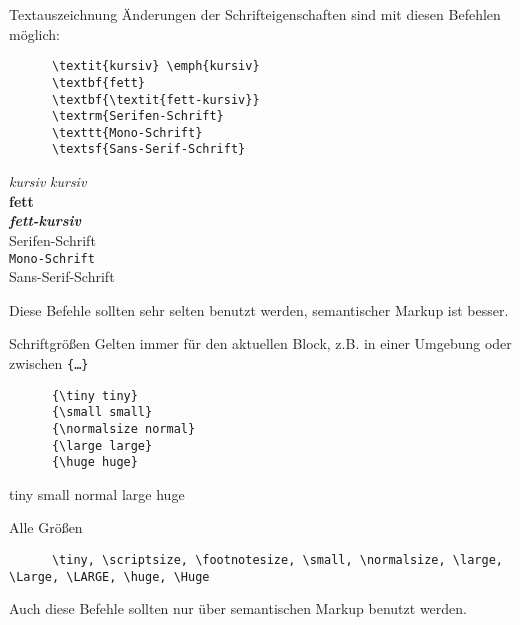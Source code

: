 \begin{frame}[fragile]{Textauszeichnung}
  Änderungen der Schrifteigenschaften sind mit diesen Befehlen möglich:
  \begin{CodeExample}{0.60}
    \begin{lstlisting}
      \textit{kursiv} \emph{kursiv}
      \textbf{fett}
      \textbf{\textit{fett-kursiv}}
      \textrm{Serifen-Schrift}
      \texttt{Mono-Schrift}
      \textsf{Sans-Serif-Schrift}
    \end{lstlisting}
  \CodeResult
    \textit{kursiv} \emph{kursiv} \\
    \textbf{fett} \\
    \textbf{\textit{fett-kursiv}} \\
    \textrm{Serifen-Schrift} \\
    \texttt{Mono-Schrift} \\
    \textsf{Sans-Serif-Schrift}
  \end{CodeExample}

  \vspace{1em}
  Diese Befehle sollten sehr selten benutzt werden, semantischer Markup ist besser.
\end{frame}

\begin{frame}[fragile]{Schriftgrößen}
  Gelten immer für den aktuellen Block, z.B. in einer Umgebung oder zwischen \texttt{\{…\}}
  \begin{CodeExample}{0.48}
    \begin{lstlisting}
      {\tiny tiny}
      {\small small}
      {\normalsize normal}
      {\large large}
      {\huge huge}
    \end{lstlisting}
  \CodeResult
    {\tiny tiny}
    {\small small}
    {\normalsize normal}
    {\large large}
    {\huge huge}
  \end{CodeExample}
  \vspace{1em}
  \begin{block}{Alle Größen}
    \begin{lstlisting}
      \tiny, \scriptsize, \footnotesize, \small, \normalsize, \large, \Large, \LARGE, \huge, \Huge
    \end{lstlisting}
  \end{block}
  Auch diese Befehle sollten nur über semantischen Markup benutzt werden.
\end{frame}

